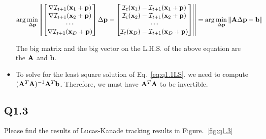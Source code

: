 \documentclass[11pt]{article}
\begin{document}
\begin{itemize}
  \begin{align} \label{eq:q1.1LS}
      \arg\min_{\Delta \mathbf{p}}
      \left \|
      \begin{bmatrix}
          \nabla \mathcal{I}_{t+1}(\mathbf{x}_1+\mathbf{p}) \\
          \nabla \mathcal{I}_{t+1}(\mathbf{x}_2+\mathbf{p}) \\
          \cdots\\
          \nabla \mathcal{I}_{t+1}(\mathbf{x}_D+\mathbf{p})
      \end{bmatrix}
      \Delta \mathbf{p} -
      \begin{bmatrix}
          \mathcal{I}_t(\mathbf{x}_1) - \mathcal{I}_{t+1} (\mathbf{x}_1+\mathbf{p})\\
          \mathcal{I}_t(\mathbf{x}_2) - \mathcal{I}_{t+1} (\mathbf{x}_2+\mathbf{p})\\
          \cdots\\
          \mathcal{I}_t(\mathbf{x}_D) - \mathcal{I}_{t+1} (\mathbf{x}_D+\mathbf{p})\\
      \end{bmatrix}
      \right \|
      =
      \arg\min_{\Delta \mathbf{p}}
      \| \mathbf{A}\Delta\mathbf{p} - \mathbf{b} \|
  \end{align}

  The big matrix and the big vector on the L.H.S. of the above equation are the $\mathbf{A}$ and $\mathbf{b}$.

  \item To solve for the least square solution of Eq.~\ref{eq:q1.1LS}, we need to compute $(\mathbf{A}^T\mathbf{A})^{-1}\mathbf{A}^T\mathbf{b}$. Therefore, we must have $\mathbf{A}^T\mathbf{A}$ to be invertible.
\end{itemize}

\newpage
\subsection*{Q1.3}

Please find the results of Lucas-Kanade tracking results in Figure.~\ref{fig:q1.3}
\end{document}
